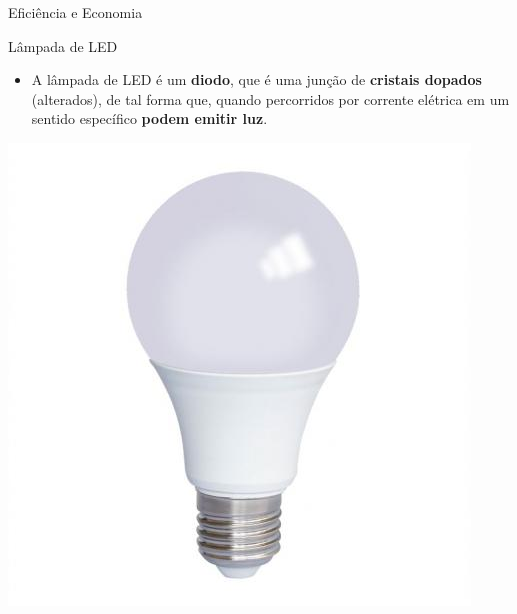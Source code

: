 \begin{frame}{Eficiência e Economia}
	\begin{block}{Lâmpada de LED}
		\begin{itemize}
			\item A lâmpada de LED é um \textbf{diodo}, que é uma junção de \textbf{cristais dopados} (alterados), de tal forma que, quando percorridos por corrente elétrica em um sentido específico \textbf{podem emitir luz}.
		\end{itemize}
	\end{block}

	\bigskip

	\centering
	\includegraphics[height=0.5\textheight]{Figuras/Ch07/fig11}
\end{frame}


